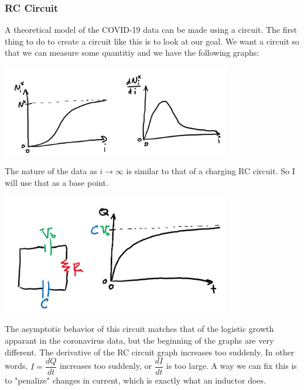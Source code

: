 \documentclass{report}
\begin{document}
            \subsubsection{RC Circuit}
                A theoretical model of the COVID-19 data can be made using a circuit. The first thing to do to create a circuit like this is to look at our goal. We want a circuit so that we can measure some quantitiy and we have the following graphs:
                \begin{center}
                    \includegraphics[width=10cm]{drawings/model_goal.png}
                \end{center}
                The nature of the data as $i \rightarrow \infty$ is similar to that of a charging RC circuit. So I will use that as a base point.
                \begin{center}
                    \includegraphics[width=10cm]{drawings/RC.png}
                \end{center}
                The asymptotic behavior of this circuit matches that of the logistic growth apparant in the coronavirus data, but the beginning of the graphs are very different. The derivative of the RC circuit graph increases too suddenly. In other words, $I = \dfrac{dQ}{dt}$ increases too suddenly, or $\dfrac{dI}{dt}$ is too large. A way we can fix this is to "penalize" changes in current, which is exactly what an inductor does.
\end{document}
